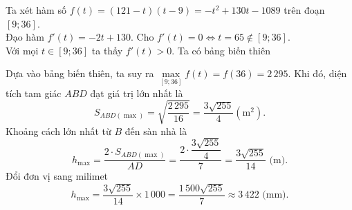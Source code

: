 \begin{ex}
{		Ta xét hàm số $f(t) = (121 - t)(t - 9) = -t^2 + 130t - 1089$ trên đoạn $[9; 36]$.\\
		Đạo hàm $f'(t) = -2t + 130$. Cho $f'(t) = 0 \Leftrightarrow t = 65 \notin [9; 36]$.\\
		Với mọi $t \in [9; 36]$ ta thấy $f'(t) > 0$. Ta có bảng biến thiên
		\begin{center}
		\end{center}
		Dựa vào bảng biến thiên, ta suy ra $\max\limits_{[9; 36]} f(t) = f(36) = 2\,295$.
		Khi đó, diện tích tam giác $ABD$ đạt giá trị lớn nhất là
		\[ S_{ABD(\max)} = \sqrt{\dfrac{2\,295}{16}} = \dfrac{3\sqrt{255}}{4} \left(\text{m}^2\right).\]
		Khoảng cách lớn nhất từ $B$ đến sàn nhà là
		\[ h_{\max} = \dfrac{2 \cdot S_{ABD(\max)}}{AD} = \dfrac{2 \cdot \dfrac{3\sqrt{255}}{4}}{7} = \dfrac{3\sqrt{255}}{14} \text{ (m)}.\]
		Đổi đơn vị sang milimet
		\[ h_{\max} = \dfrac{3\sqrt{255}}{14} \times 1\,000 = \dfrac{1\,500\sqrt{255}}{7} \approx 3\,422 \text{ (mm)}.\]
	}
\end{ex}

